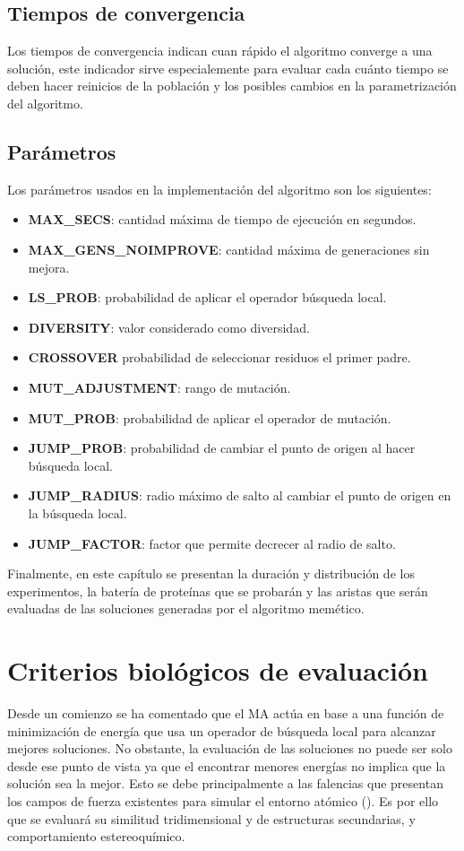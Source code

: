 \subsection{Tiempos de convergencia}
Los tiempos de convergencia indican cuan rápido el algoritmo converge a una solución, este indicador sirve especialemente para evaluar cada cuánto tiempo se deben hacer reinicios de la población y los posibles cambios en la parametrización del algoritmo.

\subsection{Parámetros}
Los parámetros usados en la implementación del algoritmo son los siguientes:
\begin{itemize}
	\item \textbf{MAX\_SECS}: cantidad máxima de tiempo de ejecución en segundos.
	\item \textbf{MAX\_GENS\_NOIMPROVE}: cantidad máxima de generaciones sin mejora.
	\item \textbf{LS\_PROB}: probabilidad de aplicar el operador búsqueda local. 
	\item \textbf{DIVERSITY}: valor considerado como diversidad.
	\item \textbf{CROSSOVER} probabilidad de seleccionar residuos el primer padre.
	\item \textbf{MUT\_ADJUSTMENT}: rango de mutación.
	\item \textbf{MUT\_PROB}: probabilidad de aplicar el operador de mutación.
	\item \textbf{JUMP\_PROB}: probabilidad de cambiar el punto de origen al hacer búsqueda local.
	\item \textbf{JUMP\_RADIUS}: radio máximo de salto al cambiar el punto de origen en la búsqueda local.
	\item \textbf{JUMP\_FACTOR}: factor que permite decrecer al radio de salto.
\end{itemize}

Finalmente, en este capítulo se presentan la duración y distribución de los experimentos, la batería de proteínas que se probarán y las aristas que serán evaluadas de las soluciones generadas por el algoritmo memético.

\section{Criterios biológicos de evaluación }

Desde un comienzo se ha comentado que el MA actúa en base a una función de minimización de energía que usa un operador de búsqueda local para alcanzar mejores soluciones. No obstante, la evaluación de las soluciones no puede ser solo desde ese punto de vista ya que el encontrar menores energías no implica que la solución sea la mejor. Esto se debe principalmente a las falencias que presentan los campos de fuerza existentes para simular el entorno atómico (\citealp{hornak:2006}). Es por ello que se evaluará su similitud tridimensional y de estructuras secundarias, y comportamiento estereoquímico.

